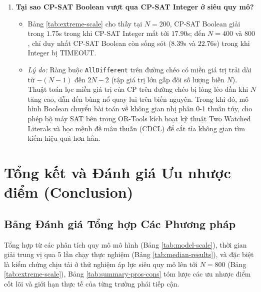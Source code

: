 \documentclass[a4paper,11pt]{article}
\begin{document}
\begin{enumerate}
    \item \textbf{Tại sao CP-SAT Boolean vượt qua CP-SAT Integer ở siêu quy mô?}
    \begin{itemize}
        \item Bảng \ref{tab:extreme-scale} cho thấy tại $N=200$, CP-SAT Boolean giải trong $1.75$s trong khi CP-SAT Integer mất tới $17.90$s; đến $N=400$ và $800$, chỉ duy nhất CP-SAT Boolean còn sống sót ($8.39$s và $22.76$s) trong khi Integer bị TIMEOUT.
        \item \textit{Lý do:} Ràng buộc \texttt{AllDifferent} trên đường chéo có miền giá trị trải dài từ $-(N-1)$ đến $2N-2$ (tập giá trị lớn gấp đôi số lượng biến $N$). Thuật toán lọc miền giá trị của CP trên đường chéo bị lỏng lẻo dần khi $N$ tăng cao, dẫn đến bùng nổ quay lui trên biến nguyên. Trong khi đó, mô hình Boolean chuyển bài toán về không gian nhị phân 0-1 thuần túy, cho phép bộ máy SAT bên trong OR-Tools kích hoạt kỹ thuật Two Watched Literals và học mệnh đề mâu thuẫn (CDCL) để cắt tỉa không gian tìm kiếm hiệu quả hơn hẳn.
    \end{itemize}
\end{enumerate}

\section{Tổng kết và Đánh giá Ưu nhược điểm (Conclusion)}

\subsection{Bảng Đánh giá Tổng hợp Các Phương pháp}

Tổng hợp từ các phân tích quy mô mô hình (Bảng \ref{tab:model-scale}), thời gian giải trung vị qua 5 lần chạy thực nghiệm (Bảng \ref{tab:median-results}), và đặc biệt là kiểm chứng chịu tải ở thử nghiệm áp lực siêu quy mô lên tới $N=800$ (Bảng \ref{tab:extreme-scale}), Bảng \ref{tab:summary-pros-cons} tóm lược các ưu nhược điểm cốt lõi và giới hạn thực tế của từng trường phái tiếp cận.
\end{document}
